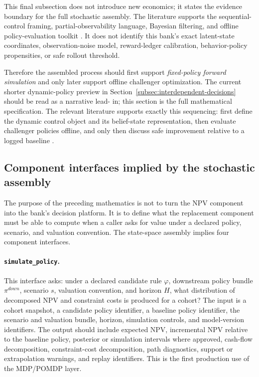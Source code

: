 \documentclass[11pt]{article}
\newcommand{\1}{\mathbf{1}}
\newcommand{\code}[1]{\nolinkurl{#1}}
\begin{document}
This final subsection does not introduce new economics; it states the evidence
boundary for the full stochastic assembly. The literature supports the
sequential-control framing, partial-observability language, Bayesian filtering,
and offline policy-evaluation toolkit
\citep{puterman1994mdp,murphy2003dynamic,smallwood1973pomdp,kaelbling1998pomdp,
trench2003bankone,durbinkoopman2012ssm,westharrison1997bfdm,doucet2001smc,
jiangli2016dr,huwager2021pomdpope,laroche2019spibb,
khraishiokhrati2022offlinecredit,chehrazi2015dynamicvaluation,
chehrazi2019collections}. It does not identify this bank's exact latent-state
coordinates, observation-noise model, reward-ledger calibration,
behavior-policy propensities, or safe rollout threshold.

Therefore the assembled process should first support
\emph{fixed-policy forward simulation} and only later support offline challenger
optimization. The current shorter dynamic-policy preview in
Section~\ref{subsec:interdependent-decisions} should be read as a narrative lead-
in; this section is the full mathematical specification. The relevant literature
supports exactly this sequencing: first define the dynamic control object and
its belief-state representation, then evaluate challenger policies offline, and
only then discuss safe improvement relative to a logged baseline
\citep{puterman1994mdp,murphy2003dynamic,jiangli2016dr,
huwager2021pomdpope,laroche2019spibb,khraishiokhrati2022offlinecredit}.

\subsection{Component interfaces implied by the stochastic assembly}
\label{subsec:state-space-component-interfaces}

The purpose of the preceding mathematics is not to turn the NPV component into
the bank's decision platform. It is to define what the replacement component must
be able to compute when a caller asks for value under a declared policy,
scenario, and valuation convention. The state-space assembly implies four
component interfaces.

\paragraph{\code{simulate_policy}.}
This interface asks: under a declared candidate rule $\varphi$, downstream
policy bundle $\pi^{down}$, scenario $s$, valuation convention, and horizon $H$,
what distribution of decomposed NPV and constraint costs is produced for a
cohort? The input is a cohort snapshot, a candidate policy identifier, a baseline
policy identifier, the scenario and valuation bundle, horizon, simulation
controls, and model-version identifiers. The output should include expected NPV,
incremental NPV relative to the baseline policy, posterior or simulation
intervals where approved, cash-flow decomposition, constraint-cost
decomposition, path diagnostics, support or extrapolation warnings, and replay
identifiers. This is the first production use of the MDP/POMDP layer.
\end{document}
